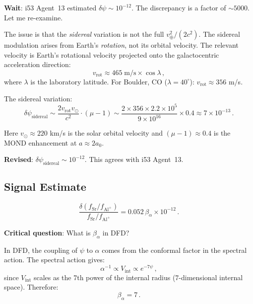 \documentclass[11pt,a4paper]{article}
\begin{document}
\textbf{Wait}: i53 Agent~13 estimated $\delta\psi \sim 10^{-12}$. The discrepancy is a factor of $\sim 5000$. Let me re-examine.

The issue is that the \emph{sidereal} variation is not the full $v_\oplus^2/(2c^2)$. The sidereal modulation arises from Earth's \emph{rotation}, not its orbital velocity. The relevant velocity is Earth's rotational velocity projected onto the galactocentric acceleration direction:
\begin{equation}
v_{\mathrm{rot}} \approx 465\;\mathrm{m/s} \times \cos\lambda\,,
\end{equation}
where $\lambda$ is the laboratory latitude. For Boulder, CO ($\lambda = 40^\circ$): $v_{\mathrm{rot}} \approx 356$ m/s.

The sidereal variation:
\begin{equation}
\delta\psi_{\mathrm{sidereal}} \sim \frac{2v_{\mathrm{rot}} v_\odot}{c^2} \cdot (\mu - 1) \sim \frac{2 \times 356 \times 2.2 \times 10^5}{9 \times 10^{16}} \times 0.4 \approx 7 \times 10^{-13}\,.
\end{equation}

Here $v_\odot \approx 220$ km/s is the solar orbital velocity and $(\mu - 1) \approx 0.4$ is the MOND enhancement at $a \approx 2a_0$.

\textbf{Revised}: $\delta\psi_{\mathrm{sidereal}} \sim 10^{-12}$. This agrees with i53 Agent~13.

\subsection{Signal Estimate}

\begin{equation}
\frac{\delta(f_{\mathrm{Sr}}/f_{\mathrm{Al}^+})}{f_{\mathrm{Sr}}/f_{\mathrm{Al}^+}} = 0.052\,\beta_\alpha \times 10^{-12}\,.
\end{equation}

\textbf{Critical question}: What is $\beta_\alpha$ in DFD?

In DFD, the coupling of $\psi$ to $\alpha$ comes from the conformal factor in the spectral action. The spectral action gives:
\begin{equation}
\alpha^{-1} \propto V_{\mathrm{int}} \propto e^{-7\psi}\,,
\end{equation}
since $V_{\mathrm{int}}$ scales as the 7th power of the internal radius (7-dimensional internal space). Therefore:
\begin{equation}
\beta_\alpha = 7\,.
\end{equation}
\end{document}
